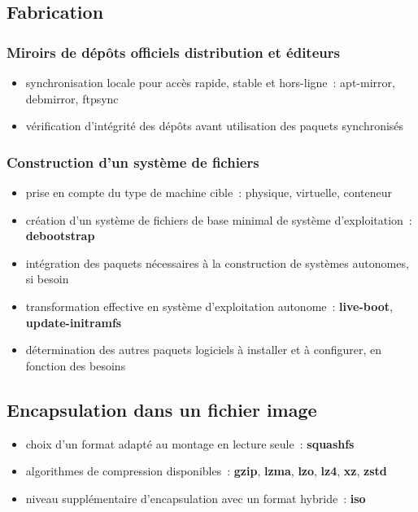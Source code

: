 \documentclass[10pt]{article}
\newenvironment{itmz}{\begin{itemize}
\setlength{\itemsep}{0em}
}{\end{itemize}}
\begin{document}
\subsection{Fabrication}

\subsubsection{Miroirs de dépôts officiels distribution et éditeurs}

\begin{itmz}
\item{synchronisation locale pour accès rapide, stable et hors-ligne : apt-mirror, debmirror, ftpsync}
\item{vérification d’intégrité des dépôts avant utilisation des paquets synchronisés}
\end{itmz}

\subsubsection{Construction d’un système de fichiers}

\begin{itmz}
\item{prise en compte du type de machine cible : physique, virtuelle, conteneur}
\item{création d’un système de fichiers de base minimal de système d’exploitation : \textbf{debootstrap}}
\item{intégration des paquets nécessaires à la construction de systèmes autonomes, si besoin}
\item{transformation effective en système d’exploitation autonome : \textbf{live-boot}, \textbf{update-initramfs}}
\item{détermination des autres paquets logiciels à installer et à configurer, en fonction des besoins}
\end{itmz}

\subsection{Encapsulation dans un fichier image}

\begin{itmz}
\item{choix d’un format adapté au montage en lecture seule : \textbf{squashfs}}
\item{algorithmes de compression disponibles : \textbf{gzip}, \textbf{lzma}, \textbf{lzo}, \textbf{lz4}, \textbf{xz}, \textbf{zstd}}
\item{niveau supplémentaire d’encapsulation avec un format hybride : \textbf{iso}}
\end{itmz}
\end{document}
